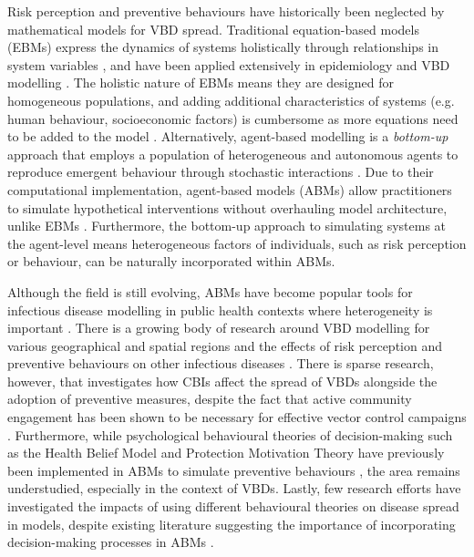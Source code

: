 Risk perception and preventive behaviours have historically been neglected by mathematical models for VBD spread. Traditional equation-based models (EBMs) express the dynamics of systems holistically through relationships in system variables \cite{van_dyke_parunak_agent-based_1998}, and have been applied extensively in epidemiology and VBD modelling \cite{reiner_systematic_2013}. The holistic nature of EBMs means they are designed for homogeneous populations, and adding additional characteristics of systems (e.g. human behaviour, socioeconomic factors) is cumbersome as more equations need to be added to the model \cite{hunter_comparison_2018}. Alternatively, agent-based modelling is a \textit{bottom-up} approach that employs a population of heterogeneous and autonomous agents to reproduce emergent behaviour through stochastic interactions \cite{epstein_growing_1996}. Due to their computational implementation, agent-based models (ABMs) allow practitioners to simulate hypothetical interventions without overhauling model architecture, unlike EBMs \cite{axtell_agent-based_2022}. Furthermore, the bottom-up approach to simulating systems at the agent-level means heterogeneous factors of individuals, such as risk perception or behaviour, can be naturally incorporated within ABMs.

Although the field is still evolving, ABMs have become popular tools for infectious disease modelling in public health contexts where heterogeneity is important \cite{tracy_agent-based_2018}. There is a growing body of research around VBD modelling for various geographical and spatial regions \cite{krzhizhanovskaya_agent-based_2020, selvaraj_vector_2020, manore_network-patch_2015, linard_multi-agent_2009, jacintho_agent-based_2010, perkins_agent-based_2019, mulyani_agent_2017, maneerat_spatial_2016} and the effects of risk perception and preventive behaviours on other infectious diseases \cite{mao_modeling_2014, kandiah_empirical_2017, du_how_2021, tully_coevolution_2013, andrews_disease_2015}. There is sparse research, however, that investigates how CBIs affect the spread of VBDs alongside the adoption of preventive measures, despite the fact that active community engagement has been shown to be necessary for effective vector control campaigns \cite{winch_effectiveness_1992, rivera_adoption_2023}. Furthermore, while psychological behavioural theories of decision-making such as the Health Belief Model \cite{becker_health_1974} and Protection Motivation Theory \cite{rogers_protection_1975} have previously been implemented in ABMs to simulate preventive behaviours \cite{abdulkareem_intelligent_2018, abdulkareem_risk_2020}, the area remains understudied, especially in the context of VBDs. Lastly, few research efforts have investigated the impacts of using different behavioural theories on disease spread in models, despite existing literature suggesting the importance of incorporating decision-making processes in ABMs \cite{scheidegger_agent-based_2017, mateus_c_modeling_2021}.

